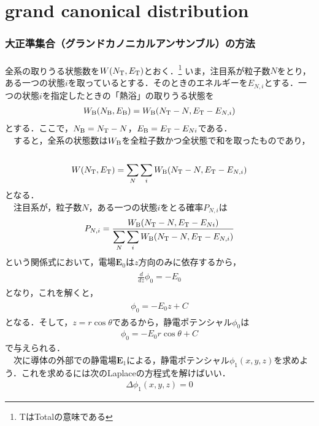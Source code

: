 \part{grand canonical distribution}
\section{大正準集合（グランドカノニカルアンサンブル）の方法}
\subsection{}
全系の取りうる状態数を$W(N_{\rm T},E_{\rm T})$とおく．\footnote{%
TはTotalの意味である
}
いま，注目系が粒子数$N$をとり，ある一つの状態$i$を取っているとする．そのときのエネルギーを$E_{N,i}$とする．一つの状態$i$を指定したときの「熱浴」の取りうる状態を
　\begin{eqnarray*}
  \begin{split}
W_{\rm B}(N_{\rm B},E_{\rm B})=W_{\rm B}(N_{\rm T}-N,E_{\rm T}-E_{N,i})
  \end{split}
\end{eqnarray*}
とする．ここで，$N_{\rm B}=N_{\rm T}-N$，$E_{\rm B}=E_{\rm T}-E_{Ni}$である．\\
　すると，全系の状態数は$W_{\rm B}$を全粒子数かつ全状態で和を取ったものであり，
　\begin{align}
W(N_{\rm T},E_{\rm T})=\displaystyle\sum_{N}\displaystyle\sum_{i}W_{\rm B}(N_{\rm T}-N,E_{\rm T}-E_{N,i})
\end{align}
となる．\\
　注目系が，粒子数$N$，ある一つの状態$i$をとる確率$P_{N,i}$は
　\begin{align}
P_{N,i}=
\frac{W_{\rm B}(N_{\rm T}-N,E_{\rm T}-E_{Ni})}{\displaystyle\sum_{N}\displaystyle\sum_{i}W_{\rm B}(N_{\rm T}-N,E_{\rm T}-E_{N,i})}
\end{align}
という関係式において，電場$\bm E_0$は$z$方向のみに依存するから，
\begin{eqnarray*}
\begin{split}
\frac{d}{dz}\phi_0=-E_0
  \end{split}
\end{eqnarray*}
となり，これを解くと，
\begin{eqnarray*}
\begin{split}
\phi_0=-E_0z+C
  \end{split}
\end{eqnarray*}
となる．そして，$z=r\cos\theta$であるから，静電ポテンシャル$\phi_0$は
　\begin{align}
\phi_0=-E_0r\cos\theta+C
\end{align}
で与えられる．\\
　次に導体の外部での静電場$\bm E_1$による，静電ポテンシャル$\phi_1(x,y,z)$を求めよう．これを求めるには次のLaplaceの方程式を解けばいい．
　\begin{align}
\Delta\phi_1(x,y,z)=0
\end{align}
